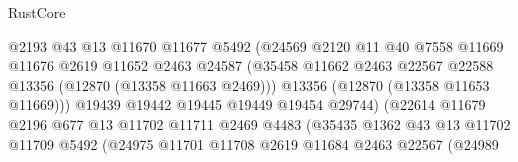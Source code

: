 \begin{lexlean}{RustCore}
\begin{coremodule}
                                      @2193
                                      @43
                                      @13
                                      @11670
                                      @11677
                                      @5492
                                      (@24569
                                        @2120
                                        @11
                                        @40
                                        @7558
                                        @11669
                                        @11676
                                        @2619
                                        @11652
                                        @2463
                                        @24587
                                        (@35458
                                          @11662
                                          @2463
                                          @22567
                                          @22588
                                          @13356
                                          (@12870 (@13358 @11663 @2469)))
                                        @13356
                                        (@12870 (@13358 @11653 @11669)))
                                      @19439
                                      @19442
                                      @19445
                                      @19449
                                      @19454
                                      @29744)
                                    (@22614
                                      @11679
                                      @2196
                                      @677
                                      @13
                                      @11702
                                      @11711
                                      @2469
                                      @4483
                                      (@35435
                                        @1362
                                        @43
                                        @13
                                        @11702
                                        @11709
                                        @5492
                                        (@24975
                                          @11701
                                          @11708
                                          @2619
                                          @11684
                                          @2463
                                          @22567
                                          (@24989

\end{coremodule}
\end{lexlean}
